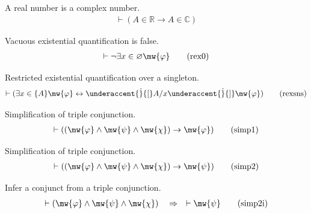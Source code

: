 \begin{lemma} {A real number is a complex number.} 
\begin{align}
\vdash ( A \in \mathbb{R} \rightarrow A \in \mathbb{C}
    )\label{eq:recn}\tag{recn}
\end{align}
\end{lemma}


\begin{lemma}  {Vacuous existential quantification is false.} 
\begin{align}
\vdash \lnot \exists x \in \varnothing \mw{\varphi}\label{eq:rex0}\tag{rex0}
\end{align}
\end{lemma}


\begin{lemma} {Restricted existential quantification over a
singleton.}
\begin{align}
\vdash ( \exists x \in \{ A \} \mw{\varphi} \leftrightarrow
    \underaccent{\dot}{[} A / x \underaccent{\dot}{]} \mw{\varphi}
    )\label{eq:rexsns}\tag{rexsns}
\end{align}
\end{lemma}


\begin{lemma} {Simplification of triple conjunction.} 
\begin{align}
\vdash ( ( \mw{\varphi} \wedge \mw{\psi} \wedge \mw{\chi} ) \rightarrow
    \mw{\varphi} )\label{eq:simp1}\tag{simp1}
\end{align}
\end{lemma}


\begin{lemma} {Simplification of triple conjunction.} 
\begin{align}
\vdash ( ( \mw{\varphi} \wedge \mw{\psi} \wedge \mw{\chi} ) \rightarrow
    \mw{\psi} )\label{eq:simp2}\tag{simp2}
\end{align}
\end{lemma}


\begin{lemma} {Infer a conjunct from a triple conjunction.}
\begin{align}
\vdash ( \mw{\varphi} \wedge \mw{\psi} \wedge \mw{\chi} )\quad\Rightarrow\quad
    \vdash \mw{\psi}\label{eq:simp2i}\tag{simp2i}
\end{align}
\end{lemma}



